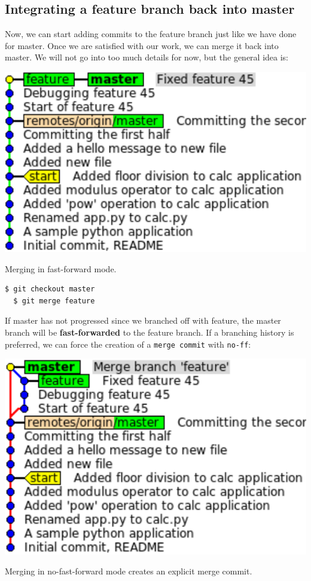 \documentclass{../../common/tufte-latex/tufte-handout}
\begin{document}
\subsection{Integrating a feature branch back into master}

Now, we can start adding commits to the feature branch just like we have done for master.
Once we are satisfied with our work, we can merge it back into master.
We will not go into too much details for now, but the general idea is:

\begin{marginfigure}%
  \centering
  \includegraphics[width=\linewidth]{gitmerge-ff.pdf}
  \label{fig:gitmerge-ff}
  \caption{Merging in fast-forward mode.}
\end{marginfigure}

\begin{lstlisting}[style=BashInputStyle]
  $ git checkout master
  $ git merge feature
\end{lstlisting}

If master has not progressed since we branched off with feature, the master branch will be \textbf{fast-forwarded} to the feature branch.
If a branching history is preferred, we can force the creation of a \texttt{merge commit} with \texttt{no-ff}:

\begin{marginfigure}%
  \centering
  \includegraphics[width=\linewidth]{gitmerge-noff.pdf}
  \label{fig:gitmerge-noff}
  \caption{Merging in no-fast-forward mode creates an explicit merge commit.}
\end{marginfigure}
\end{document}
